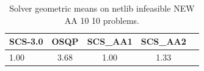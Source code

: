 \begin{table}
\centering
\caption{Solver geometric means on netlib infeasible NEW AA 10 10 problems.}
\label{t-netlib infeasible NEW AA 10 10-geom_mean}
\begin{tabular}{lcccc}
\toprule
 SCS-3.0 &  OSQP &  SCS\_AA1 &  SCS\_AA2 \\
\midrule
    1.00 &  3.68 &     1.00 &     1.33 \\
\bottomrule
\end{tabular}
\end{table}
